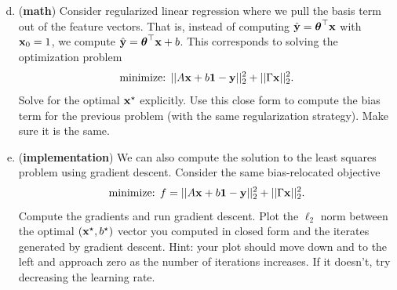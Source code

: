 \documentclass[12pt,letterpaper]{hmcpset}
\begin{document}
\begin{problem}[3 (continued)]
\begin{enumerate}[(a)]
	\setcounter{enumi}{3}
\item (\textbf{math}) Consider regularized linear regression where we pull the
basis term out of the feature vectors. That is, instead of computing $\hat{{\bf y}}
= \hbox{\boldmath$\theta$}^\top{\bf x}$ with ${\bf x}_0 = 1$, we compute $\hat{{\bf y}} = \hbox{\boldmath$\theta$}^\top{\bf x} + b$.
This corresponds to solving the optimization problem
\[
\text{minimize: } ||A{\bf x} + b{\bf 1} - {\bf y}||_2^2 + ||\Gamma{\bf x}||_2^2.
\]
Solve for the optimal ${\bf x}^\star$ explicitly. Use this close form to compute the
bias term for the previous problem (with the same regularization strategy). Make
sure it is the same.
\newline
\item (\textbf{implementation}) We can also compute the solution to the least squares
problem using gradient descent. Consider the same bias-relocated objective
\[
\text{minimize: } f = ||A{\bf x} + b{\bf 1} - {\bf y}||_2^2 + ||\Gamma{\bf x}||_2^2.
\]
Compute the gradients and run gradient descent. Plot the $\ell_2$ norm
between the optimal $({\bf x}^\star, b^\star)$ vector you computed in closed form
and the iterates generated by gradient descent. Hint: your plot should move
down and to the left and approach zero as the number of iterations increases. If
it doesn't, try decreasing the learning rate.
\end{enumerate}
\end{problem}
\end{document}
